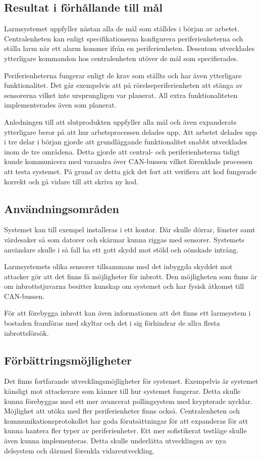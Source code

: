 \documentclass[a4paper]{article}
\newcommand{\todo}[1]{\marginpar{TODO: #1}\vspace{1cm}}
\begin{document}
\subsection{Resultat i förhållande till mål}

Larmsystemet uppfyller nästan alla de mål som ställdes i början av arbetet.
Centralenheten kan enligt specifikationerna konfigurera periferienheterna och ställa larm när ett alarm kommer ifrån en periferienheten.
Dessutom utvecklades ytterligare kommandon hos centralenheten utöver de mål som specifierades.

Periferienheterna fungerar enligt de krav som ställts och har även ytterligare funktionalitet.
Det går exempelvis att på rörelseperiferienheten att stänga av sensorerna vilket inte ursprungligen var planerat. All extra funktionaliteten implementerades även som planerat.

Anledningen till att slutprodukten uppfyller alla mål och även expanderats ytterligare beror på att hur arbetsprocessen delades upp.
Att arbetet delades upp i tre delar i början gjorde att grundläggande funktionalitet snabbt utvecklades inom de tre områdena.
Detta gjorde att central- och periferienheterna tidigt kunde kommunicera med varandra över CAN-bussen vilket förenklade processen att testa systemet.
På grund av detta gick det fort att verifiera att kod fungerade korrekt och gå vidare till att skriva ny kod.

\subsection{Användningsområden}
Systemet kan till exempel installeras i ett kontor.
Där skulle dörrar, fönster samt värdesaker så som datorer och skärmar kunna riggas med sensorer.
Systemets användare skulle i så fall ha ett gott skydd mot stöld och oönskade intrång.

Larmsystemets olika sensorer tillsammans med det inbyggda skyddet mot attacker gör att det finns få möjligheter för inbrott.
Den möjligheten som finns är om inbrottstjuvarna besitter kunskap om systemet och har fysisk åtkomst till CAN-bussen.

För att förebygga inbrott kan även informationen att det finns ett larmsystem i bostaden framföras med skyltar och det i sig förhindrar de allra flesta inbrottsförsök.

\todo{Källa. Förbättra}
\subsection{Förbättringsmöjligheter}
Det finns fortfarande utvecklingsmöjligheter för systemet.
Exempelvis är systemet känsligt mot attackerare som känner till hur systemet fungerar.
Detta skulle kunna förebyggas med ett mer avancerat pollingsystem med krypterade nycklar.
Möjlighet att utöka med fler periferienheter finns också.
Centralenheten och kommunikationsprotokollet har goda förutsättningar för att expanderas för att kunna hantera fler typer av periferienheter.
Ett mer sofistikerat testläge skulle även kunna implementeras.
Detta skulle underlätta utvecklingen av nya delsystem och därmed förenkla vidareutveckling.
\end{document}
